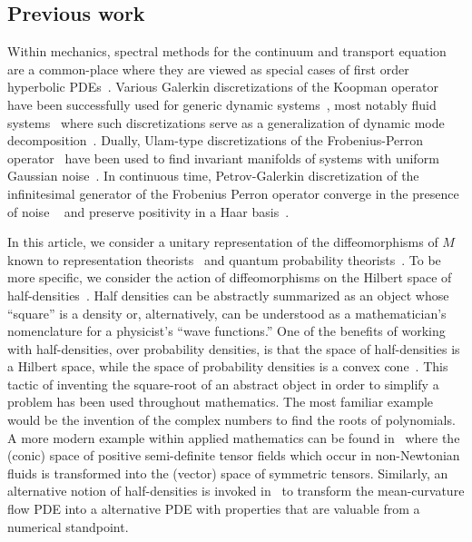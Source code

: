 \documentclass[final,leqno]{siamart}
\begin{document}
\subsection{Previous work}
Within mechanics, spectral methods for the continuum and transport equation are a common-place where they are viewed as special cases of first order hyperbolic PDEs~\cite{Gottlieb2001}.
Various Galerkin discretizations of the Koopman operator have been successfully used for generic dynamic systems~\cite{BudisicMohrMezic2012,Mezic2005}, most notably fluid systems~\cite{Rowley2009} where such discretizations serve as a generalization of dynamic mode decomposition~\cite{Schmid2010}.
Dually, Ulam-type discretizations of the Frobenius-Perron operator~\cite{LasotaMackey1994,Ulam1947} have been used to find invariant manifolds of systems with uniform Gaussian noise~\cite{FroylandJungeKoltai2013,FroylandPadberg2009}.
In continuous time, Petrov-Galerkin discretization of the infinitesimal generator of the Frobenius Perron operator converge in the presence of noise ~\cite{BittracherKoltaiJunge2015} and preserve positivity in a Haar basis~\cite{koltai2011thesis}.

In this article, we consider a unitary representation of the diffeomorphisms of $M$ known to representation theorists~\cite{Ismagilov1975,VershilGelfandGraev1975} and quantum probability theorists~\cite{Meyer1998}.
To be more specific, we consider the action of diffeomorphisms on the Hilbert space of half-densities~\cite{BatesWeinstein1997,GuilleminSternberg1970}.
Half densities can be abstractly summarized as an object whose ``square'' is a density
or, alternatively, can be understood as a mathematician's nomenclature for a physicist's ``wave functions.''
One of the benefits of working with half-densities, over probability densities, is that the space of half-densities is a Hilbert space, while the space of probability densities is a convex cone~\cite{GuilleminSternberg1970}.
This tactic of inventing the square-root of an abstract object in order to simplify a problem has been used throughout mathematics.
The most familiar example would be the invention of the complex numbers to find the roots of polynomials.
A more modern example within applied mathematics can be found in~\cite{Balci2011} where the (conic) space of positive semi-definite tensor fields which occur in non-Newtonian fluids is transformed into the (vector) space of symmetric tensors.
Similarly, an alternative notion of half-densities is invoked in~\cite{Crane2013} to transform the mean-curvature flow PDE into a alternative PDE with properties that are valuable from a numerical standpoint.
\end{document}
